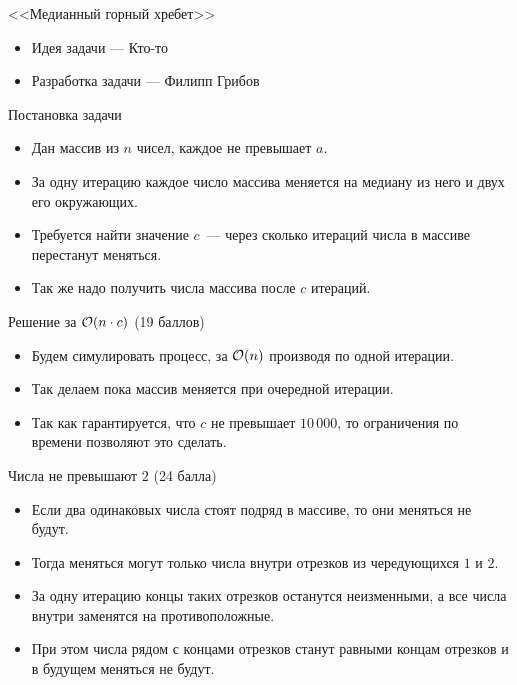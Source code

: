 \begin{frame}
  \begin{center}
    \LARGE <<Медианный горный хребет>>
  \end{center}

  \begin{itemize}
  \item Идея задачи --- Кто-то
  \item Разработка задачи --- Филипп Грибов
  \end{itemize}

\end{frame}

\begin{frame}{Постановка задачи}

  \begin{itemize}
  \item Дан массив из $n$ чисел, каждое не превышает $a$.
  \item За одну итерацию каждое число массива меняется на медиану из него и двух его окружающих.
  \item Требуется найти значение $c$~--- через сколько итераций числа в массиве перестанут меняться.
  \item Так же надо получить числа массива после $c$ итераций.
  \end{itemize}
  
\end{frame}

\begin{frame}{Решение за $\mathcal{O}(n \cdot c)$ (19 баллов)}
  \begin{itemize}
  \item Будем симулировать процесс, за $\mathcal{O}(n)$ производя по одной итерации.
  \item Так делаем пока массив меняется при очередной итерации.
  \item Так как гарантируется, что $c$ не превышает $10\,000$, то ограничения по времени позволяют это сделать.
  \end{itemize}
\end{frame}

\begin{frame}{Числа не превышают $2$ (24 балла)}
  \begin{itemize}
  \item Если два одинаковых числа стоят подряд в массиве, то они меняться не будут.
  \item Тогда меняться могут только числа внутри отрезков из чередующихся $1$ и $2$.
  \item За одну итерацию концы таких отрезков останутся неизменными, а все числа внутри заменятся на противоположные.
  \item При этом числа рядом с концами отрезков станут равными концам отрезков и в будущем меняться не будут.
  \end{itemize}
\end{frame}

